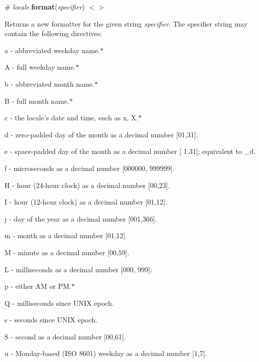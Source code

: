 \label{_locale_format}%
\# {\itshape locale}.{\bfseries format}({\itshape specifier}) \href{https://github.com/d3/d3-time-format/blob/master/src/locale.js#L293}{\tt $<$$>$}

Returns a new formatter for the given string {\itshape specifier}. The specifier string may contain the following directives\+:


\begin{DoxyItemize}
\item {\ttfamily a} -\/ abbreviated weekday name.$\ast$
\item {\ttfamily A} -\/ full weekday name.$\ast$
\item {\ttfamily b} -\/ abbreviated month name.$\ast$
\item {\ttfamily B} -\/ full month name.$\ast$
\item {\ttfamily c} -\/ the locale’s date and time, such as {\ttfamily x, X}.$\ast$
\item {\ttfamily d} -\/ zero-\/padded day of the month as a decimal number \mbox{[}01,31\mbox{]}.
\item {\ttfamily e} -\/ space-\/padded day of the month as a decimal number \mbox{[} 1,31\mbox{]}; equivalent to {\ttfamily \+\_\+d}.
\item {\ttfamily f} -\/ microseconds as a decimal number \mbox{[}000000, 999999\mbox{]}.
\item {\ttfamily H} -\/ hour (24-\/hour clock) as a decimal number \mbox{[}00,23\mbox{]}.
\item {\ttfamily I} -\/ hour (12-\/hour clock) as a decimal number \mbox{[}01,12\mbox{]}.
\item {\ttfamily j} -\/ day of the year as a decimal number \mbox{[}001,366\mbox{]}.
\item {\ttfamily m} -\/ month as a decimal number \mbox{[}01,12\mbox{]}.
\item {\ttfamily M} -\/ minute as a decimal number \mbox{[}00,59\mbox{]}.
\item {\ttfamily L} -\/ milliseconds as a decimal number \mbox{[}000, 999\mbox{]}.
\item {\ttfamily p} -\/ either AM or PM.$\ast$
\item {\ttfamily Q} -\/ milliseconds since U\+N\+IX epoch.
\item {\ttfamily s} -\/ seconds since U\+N\+IX epoch.
\item {\ttfamily S} -\/ second as a decimal number \mbox{[}00,61\mbox{]}.
\item {\ttfamily u} -\/ Monday-\/based (I\+SO 8601) weekday as a decimal number \mbox{[}1,7\mbox{]}.

\end{DoxyItemize}
